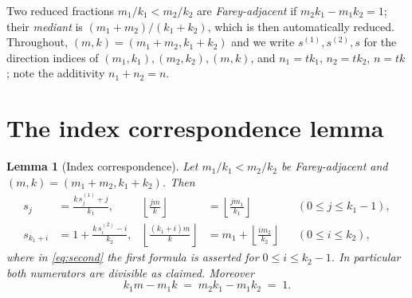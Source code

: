 \documentclass[11pt]{article}
\newtheorem{lemma}[theorem]{Lemma}
\theoremstyle{remark}
\theoremstyle{definition}
\newcommand{\floor}[1]{\left\lfloor #1 \right\rfloor}
\begin{document}
Two reduced fractions $m_1/k_1<m_2/k_2$ are \emph{Farey-adjacent} if
$m_2k_1-m_1k_2=1$; their \emph{mediant} is $(m_1+m_2)/(k_1+k_2)$, which is then
automatically reduced. Throughout, $(m,k)=(m_1+m_2,k_1+k_2)$ and we write
$s^{(1)},s^{(2)},s$ for the direction indices of $(m_1,k_1),(m_2,k_2),(m,k)$, and
$n_1=t k_1$, $n_2=t k_2$, $n=t k$; note the additivity $n_1+n_2=n$.

\section{The index correspondence lemma}\label{sec:lemma}

\begin{lemma}[Index correspondence]\label{lem:index}
Let $m_1/k_1<m_2/k_2$ be Farey-adjacent and $(m,k)=(m_1+m_2,k_1+k_2)$. Then
\begin{align}
s_j &= \frac{k\,s^{(1)}_j + j}{k_1}, &
\floor{\tfrac{jm}{k}} &= \floor{\tfrac{jm_1}{k_1}}
&& (0\le j\le k_1-1), \tag{$\ast$1}\label{eq:first}\\[2pt]
s_{k_1+i} &= 1 + \frac{k\,s^{(2)}_i - i}{k_2}, &
\floor{\tfrac{(k_1+i)m}{k}} &= m_1 + \floor{\tfrac{im_2}{k_2}}
&& (0\le i\le k_2), \tag{$\ast$2}\label{eq:second}
\end{align}
where in \eqref{eq:second} the first formula is asserted for $0\le i\le k_2-1$.
In particular both numerators are divisible as claimed. Moreover
\begin{equation}
k_1 m - m_1 k \;=\; m_2k_1-m_1k_2 \;=\; 1. \tag{$\star$}\label{eq:star}
\end{equation}
\end{lemma}
\end{document}

